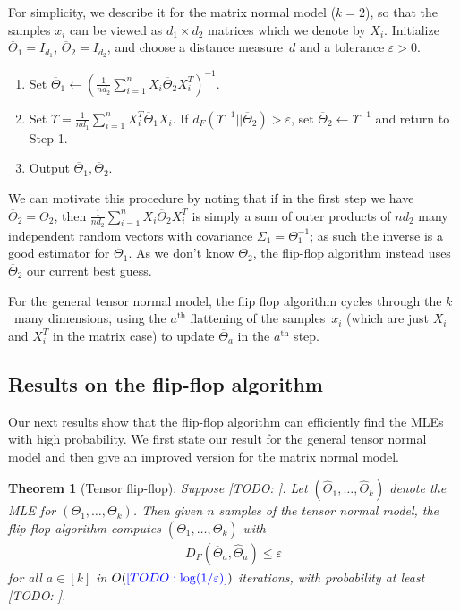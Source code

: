 \documentclass[aos]{imsart}
\newtheorem{theorem}{Theorem}[section]
\theoremstyle{definition}
\numberwithin{equation}{section}
\newcommand{\eps}{\varepsilon}
\newcommand{\samp}{x}
\newcommand{\TODO}[1]{{\color{blue}[TODO: #1]}}
\begin{document}
For simplicity, we describe it for the matrix normal model ($k=2$), so that the samples $\samp_i$ can be viewed as $d_1\times d_2$ matrices which we denote by $X_i$.
Initialize $\overline{\Theta}_1 = I_{d_1}$, $\overline{\Theta}_2 = I_{d_2}$, and choose a distance measure~$d$ and a tolerance $\eps > 0$.
\begin{enumerate}
\item Set $\overline{\Theta}_1 \leftarrow (\frac{1}{n d_2} \sum_{i = 1}^n X_i \overline{\Theta}_2 X_i^T)^{-1}.$
\item Set $\Upsilon = \frac{1}{n d_1} \sum_{i = 1}^n X_i^T \overline{\Theta}_1 X_i$.
If $d_F( \Upsilon^{-1}|| \overline{\Theta}_2) > \eps$, set $\overline{\Theta}_2 \leftarrow \Upsilon^{-1}$ and return to Step 1.
\item Output $\overline{\Theta}_1, \overline{\Theta}_2$.
\end{enumerate}

We can motivate this procedure by noting that if in the first step we have $\overline{\Theta}_2 = \Theta_2$, then $\frac{1}{n d_2} \sum_{i = 1}^n X_i \overline{\Theta}_2 X_i^T$ is simply a sum of outer products of $nd_2$ many independent random vectors with covariance $\Sigma_1 = \Theta_1^{-1}$; as such the inverse is a good estimator for $\Theta_1$.
As we don't know $\Theta_2$, the flip-flop algorithm instead uses $\overline{\Theta}_2$ our current best guess.

For the general tensor normal model, the flip flop algorithm cycles through the $k$~many dimensions, using the $a^\text{th}$ flattening of the samples~$x_i$ (which are just $X_i$ and $X_i^T$ in the matrix case) to update $\overline{\Theta}_a$ in the $a^\text{th}$ step.

\subsection{Results on the flip-flop algorithm}
Our next results show that the flip-flop algorithm can efficiently find the MLEs with high probability.
We first state our result for the general tensor normal model and then give an improved version for the matrix normal model.

\begin{theorem}[Tensor flip-flop]\label{thm:tensor-flipflop}
Suppose \TODO{}.
Let $(\widehat{\Theta}_1,\dots,\widehat{\Theta}_k)$ denote the MLE for $(\Theta_1,\dots,\Theta_k)$.
Then given $n$ samples of the tensor normal model, the flip-flop algorithm computes $(\overline{\Theta}_1,\dots,\overline{\Theta}_k)$ with
\begin{align*}
  D_F(\overline{\Theta}_a, \widehat{\Theta}_a) \leq \eps
\end{align*}
for all $a\in[k]$ in $O(\TODO{\log(1/\eps)})$ iterations, with probability at least \TODO{}.
\end{theorem}
\end{document}
